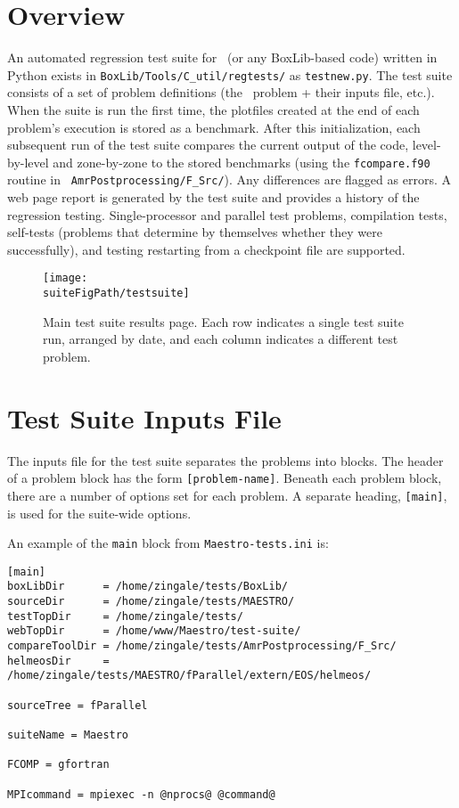 \section{Overview}

An automated regression test suite for \maestro\ (or any BoxLib-based
code) written in Python exists in {\tt BoxLib/Tools/C\_util/regtests/}
as {\tt testnew.py}.  The test suite consists of a set of problem
definitions (the \maestro\ problem + their inputs file, etc.).  When
the suite is run the first time, the plotfiles created at the end of
each problem's execution is stored as a benchmark.  After this
initialization, each subsequent run of the test suite compares the
current output of the code, level-by-level and zone-by-zone to the
stored benchmarks (using the {\tt fcompare.f90} routine in {\tt
  AmrPostprocessing/F\_Src/}).  Any differences are flagged as errors.
A web page report is generated by the test suite and provides a
history of the regression testing.  Single-processor and parallel test
problems, compilation tests, self-tests (problems that determine by
themselves whether they were successfully), and testing restarting
from a checkpoint file are supported.

\begin{figure}[t]
\centering
\texttt{[image: \\suiteFigPath/testsuite]}
\caption{\label{fig:test_suite_main} Main test suite results page.  Each 
row indicates a single test suite run, arranged by date, and each column
indicates a different test problem. }
\end{figure}

\section{Test Suite Inputs File}

The inputs file for the test suite separates the problems into blocks.
The header of a problem block has the form {\tt [problem-name]}.
Beneath each problem block, there are a number of options set for each
problem.  A separate heading, {\tt [main]}, is used for the suite-wide
options.

An example of the {\tt main} block from {\tt Maestro-tests.ini} is:
\begin{lstlisting}
[main]
boxLibDir      = /home/zingale/tests/BoxLib/
sourceDir      = /home/zingale/tests/MAESTRO/
testTopDir     = /home/zingale/tests/
webTopDir      = /home/www/Maestro/test-suite/
compareToolDir = /home/zingale/tests/AmrPostprocessing/F_Src/
helmeosDir     = /home/zingale/tests/MAESTRO/fParallel/extern/EOS/helmeos/

sourceTree = fParallel

suiteName = Maestro

FCOMP = gfortran

MPIcommand = mpiexec -n @nprocs@ @command@
\end{lstlisting}

